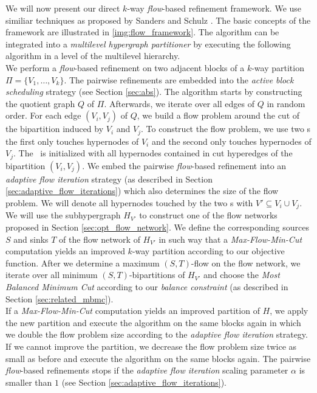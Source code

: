 We will now present our direct $k$-way \emph{flow}-based refinement framework. 
We use similiar techniques as proposed
by Sanders and Schulz \cite{sanders2011engineering}. 
The basic concepts of the framework are illustrated in \autoref{img:flow_framework}.
The algorithm can be integrated into a \emph{multilevel hypergraph partitioner} 
by executing the following algorithm in a level of the multilevel hierarchy.  \\
We perform a \emph{flow}-based refinement on two adjacent blocks of
a $k$-way partition $\Pi = \{V_1,\ldots,V_k\}$. The pairwise refinements are embedded 
into the \emph{active block scheduling} strategy (see Section \ref{sec:abs}).
The algorithm starts by constructing the quotient graph $Q$ of $\Pi$. 
Afterwards, we iterate over all edges of $Q$ in random order. For each edge
$(V_i,V_j)$ of $Q$, we build a flow problem around the cut of the bipartition
induced by $V_i$ and $V_j$. To construct the flow problem, we use two \BFS s the first only 
touches hypernodes of $V_i$ and the second only touches hypernodes of $V_j$.
The \BFS~is initialized with all hypernodes contained in cut hyperedges
of the bipartition $(V_i,V_j)$. We embed the pairwise \emph{flow}-based refinement
into an \emph{adaptive flow iteration} strategy
(as described in Section \ref{sec:adaptive_flow_iterations}) which also determines
the size of the flow problem. We will denote all hypernodes touched by 
the two \BFS s with $V' \subseteq V_i \cup V_j$.\\
We will use the subhypergraph $H_{V'}$ to construct one of the flow networks 
proposed in Section \ref{sec:opt_flow_network}. 
We define the corresponding sources $S$
and sinks $T$ of the flow network of $H_{V'}$ in such way that a \emph{Max-Flow-Min-Cut} 
computation yields an improved $k$-way partition according to our objective function.
After we determine a maximum $(S,T)$-flow on the flow network, we iterate over
all minimum $(S,T)$-bipartitions of $H_{V'}$  and choose 
the \emph{Most Balanced Minimum Cut} according to our \emph{balance constraint} 
(as described in Section \ref{sec:related_mbmc}). \\
If a \emph{Max-Flow-Min-Cut} computation yields an improved partition of $H$, we apply
the new partition and execute the algorithm on the same blocks again in which we double
the flow problem size according to the \emph{adaptive flow iteration} strategy. If
we cannot improve the partition, we decrease the flow problem size twice as small
as before and execute the algorithm on the same blocks again. The pairwise \emph{flow}-based
refinements stops if the \emph{adaptive flow iteration} scaling parameter $\alpha$ is
smaller than $1$ (see Section \ref{sec:adaptive_flow_iterations}).

